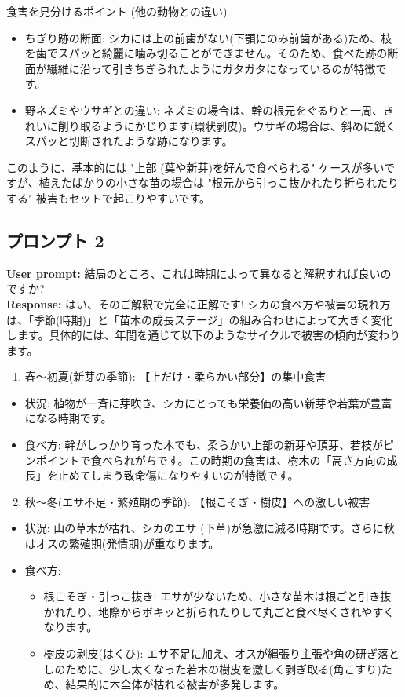 \documentclass[a4paper, 11pt]{jsarticle}
\begin{document}
食害を見分けるポイント (他の動物との違い)
\begin{itemize}
    \item ちぎり跡の断面: シカには上の前歯がない(下顎にのみ前歯がある)ため、枝を歯でスパッと綺麗に噛み切ることができません。そのため、食べた跡の断面が繊維に沿って引きちぎられたようにガタガタになっているのが特徴です。
    \item 野ネズミやウサギとの違い: ネズミの場合は、幹の根元をぐるりと一周、きれいに削り取るようにかじります(環状剥皮)。ウサギの場合は、斜めに鋭くスパッと切断されたような跡になります。
\end{itemize}
このように、基本的には "上部 (葉や新芽)を好んで食べられる" ケースが多いですが、植えたばかりの小さな苗の場合は "根元から引っこ抜かれたり折られたりする" 被害もセットで起こりやすいです。

\subsection{プロンプト 2}
\noindent\textbf{User prompt:} 結局のところ、これは時期によって異なると解釈すれば良いのですか? \\
\noindent\textbf{Response:} はい、そのご解釈で完全に正解です!
シカの食べ方や被害の現れ方は、「季節(時期)」と「苗木の成長ステージ」の組み合わせによって大きく変化します。具体的には、年間を通じて以下のようなサイクルで被害の傾向が変わります。
\begin{enumerate}
    \item 春〜初夏(新芽の季節): 【上だけ・柔らかい部分】の集中食害
\end{enumerate}
\begin{itemize}
    \item 状況: 植物が一斉に芽吹き、シカにとっても栄養価の高い新芽や若葉が豊富になる時期です。
    \item 食べ方: 幹がしっかり育った木でも、柔らかい上部の新芽や頂芽、若枝がピンポイントで食べられがちです。この時期の食害は、樹木の「高さ方向の成長」を止めてしまう致命傷になりやすいのが特徴です。
\end{itemize}
\begin{enumerate}
    \setcounter{enumi}{1}
    \item 秋〜冬(エサ不足・繁殖期の季節): 【根こそぎ・樹皮】への激しい被害
\end{enumerate}
\begin{itemize}
    \item 状況: 山の草木が枯れ、シカのエサ (下草)が急激に減る時期です。さらに秋はオスの繁殖期(発情期)が重なります。
    \item 食べ方:
    \begin{itemize}
        \item[○] 根こそぎ・引っこ抜き: エサが少ないため、小さな苗木は根ごと引き抜かれたり、地際からボキッと折られたりして丸ごと食べ尽くされやすくなります。
        \item[○] 樹皮の剥皮(はくひ): エサ不足に加え、オスが縄張り主張や角の研ぎ落としのために、少し太くなった若木の樹皮を激しく剥ぎ取る(角こすり)ため、結果的に木全体が枯れる被害が多発します。
    \end{itemize}
\end{itemize}
\end{document}
